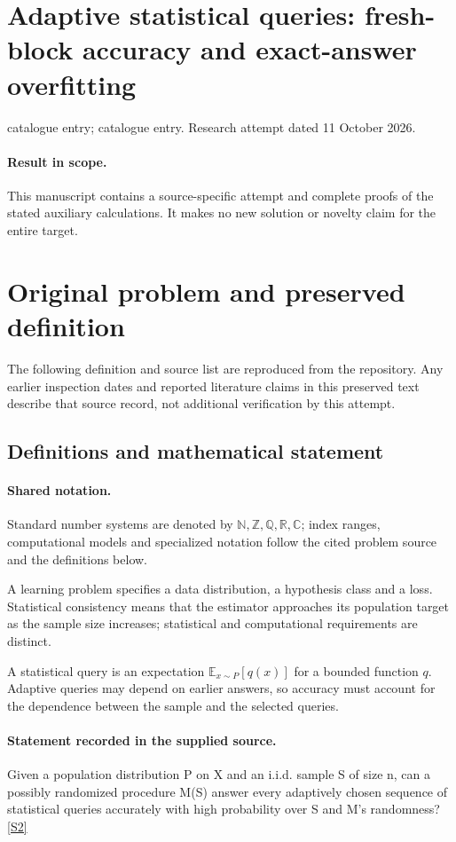 \documentclass[11pt]{article}
\begin{document}
\section*{Adaptive statistical queries: fresh-block accuracy and exact-answer overfitting}
\noindent catalogue entry; catalogue entry. Research attempt dated 11 October 2026.
\paragraph{Result in scope.}This manuscript contains a source-specific attempt and complete proofs of the stated auxiliary calculations. It makes no new solution or novelty claim for the entire target.
\section{Original problem and preserved definition}
The following definition and source list are reproduced from the repository. Any earlier inspection dates and reported literature claims in this preserved text describe that source record, not additional verification by this attempt.
\subsection{Definitions and mathematical statement}

\paragraph{Shared notation.}Standard number systems are denoted by $\mathbb N,\mathbb Z,\mathbb Q,\mathbb R,\mathbb C$; index ranges, computational models and specialized notation follow the cited problem source and the definitions below.


A learning problem specifies a data distribution, a hypothesis class and a loss. Statistical consistency means that the estimator approaches its population target as the sample size increases; statistical and computational requirements are distinct.

A statistical query is an expectation $\mathbb E_{x\sim P}[q(x)]$ for a bounded function $q$. Adaptive queries may depend on earlier answers, so accuracy must account for the dependence between the sample and the selected queries.
\paragraph{Statement recorded in the supplied source.}
Given a population distribution P on X and an i.i.d. sample S of size n, can a possibly randomized procedure M(S) answer every adaptively chosen sequence of statistical queries accurately with high probability over S and M's randomness? \href{https://doi.org/10.4171/owr/2015/54}{[S2]}
\end{document}
